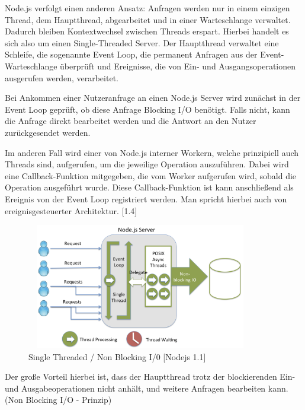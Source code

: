 \newpage

Node.js verfolgt einen anderen Ansatz: Anfragen werden nur in einem einzigen Thread, dem Hauptthread, abgearbeitet und in einer Warteschlange verwaltet. Dadurch bleiben Kontextwechsel zwischen Threads erspart. Hierbei handelt es sich also um einen Single-Threaded Server. Der Hauptthread verwaltet eine Schleife, die sogenannte Event Loop, die permanent Anfragen aus der Event-Warteschlange überprüft und Ereignisse, die von Ein- und Ausgangsoperationen ausgerufen werden, verarbeitet.
\newline

Bei Ankommen einer Nutzeranfrage an einen Node.js Server wird zunächst in der Event Loop geprüft, ob diese Anfrage Blocking I/O benötigt. Falls nicht, kann die Anfrage direkt bearbeitet werden und die Antwort an den Nutzer zurückgesendet werden. 
\newline

Im anderen Fall wird einer von Node.js interner Workern, welche prinzipiell auch Threads sind, aufgerufen, um die jeweilige Operation auszuführen. Dabei wird eine Callback-Funktion mitgegeben, die vom Worker aufgerufen wird, sobald die Operation ausgeführt wurde. Diese Callback-Funktion ist kann anschließend als Ereignis von der Event Loop registriert werden. Man spricht hierbei auch von ereignisgesteuerter Architektur. [1.4]
\newline
 
\begin{figure}[h]
\centering
\includegraphics[width=10cm, height = 5.5cm]{images/nodejs_nodethreading.png}
\caption{ Single Threaded / Non Blocking I/0 [Nodejs 1.1]}
\end{figure}
 
 
Der große Vorteil hierbei ist, dass der Hauptthread trotz der blockierenden Ein- und Aus\-gabeoperationen nicht anhält, und weitere Anfragen bearbeiten kann. (Non Blocking I/O - Prinzip) 
\newline

